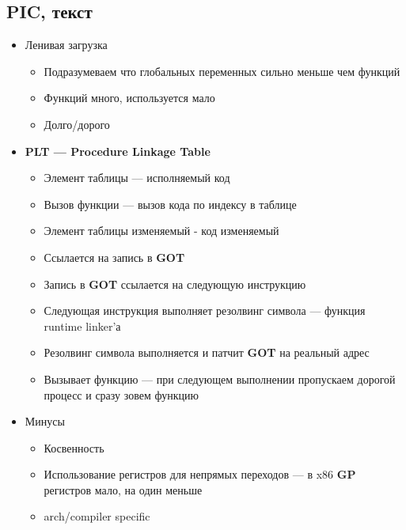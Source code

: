 \documentclass[../../lectures.tex]{subfiles}
\begin{document}
\subsection{PIC, текст}
\begin{itemize}
    \item Ленивая загрузка
        \begin{itemize}
            \item Подразумеваем что глобальных переменных сильно меньше чем функций
            \item Функций много, используется мало
            \item Долго/дорого
        \end{itemize}
    \item \textbf{PLT --- Procedure Linkage Table}
        \begin{itemize}
            \item Элемент таблицы --- исполняемый код
            \item Вызов функции --- вызов кода по индексу в таблице
            \item Элемент таблицы изменяемый - код изменяемый
            \item Ссылается на запись в \textbf{GOT}
            \item Запись в \textbf{GOT} ссылается на следующую инструкцию
            \item Следующая инструкция выполняет резолвинг символа --- функция runtime linker'а
            \item Резолвинг символа выполняется и патчит \textbf{GOT} на реальный адрес
            \item Вызывает функцию --- при следующем выполнении пропускаем дорогой процесс и сразу зовем функцию
        \end{itemize}
    \item Минусы
        \begin{itemize}
            \item Косвенность
            \item Использование регистров для непрямых переходов --- в x86 \textbf{GP} регистров мало, на один меньше
            \item arch/compiler specific
        \end{itemize}
\end{itemize}
\end{document}
